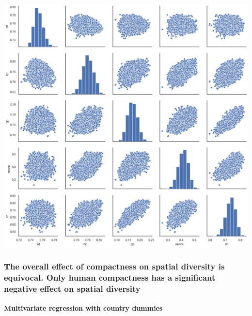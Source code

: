 \documentclass[]{article}
\let\oldparagraph\paragraph
\renewcommand{\paragraph}[1]{\oldparagraph{#1}\mbox{}}
\begin{document}
\includegraphics{../30_results/09_pairwise_plot_grouped.png}

\hypertarget{the-overall-effect-of-compactness-on-spatial-diversity-is-equivocal.-only-human-compactness-has-a-significant-negative-effect-on-spatial-diversity}{%
\subsubsection{The overall effect of compactness on spatial diversity is
equivocal. Only human compactness has a significant negative effect on
spatial
diversity}\label{the-overall-effect-of-compactness-on-spatial-diversity-is-equivocal.-only-human-compactness-has-a-significant-negative-effect-on-spatial-diversity}}

\hypertarget{multivariate-regression-with-country-dummies}{%
\paragraph{Multivariate regression with country
dummies}\label{multivariate-regression-with-country-dummies}}
\end{document}
